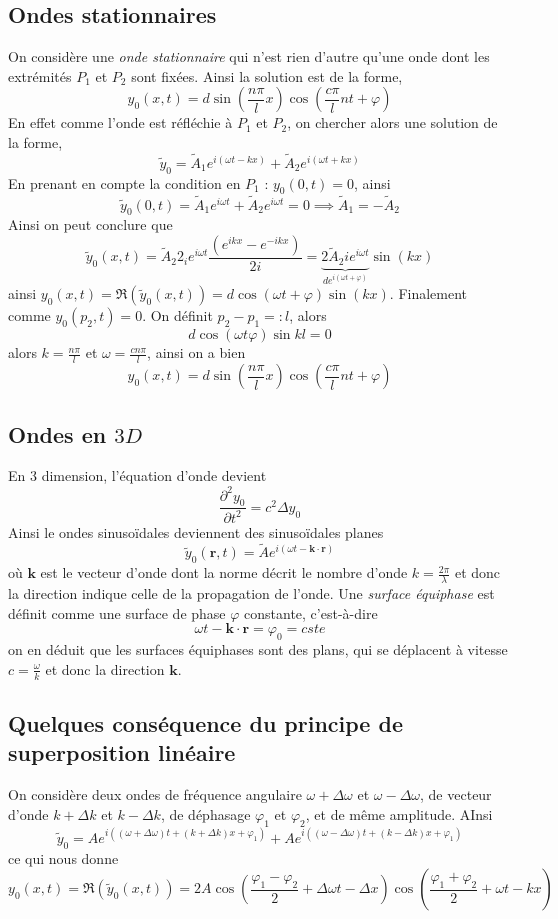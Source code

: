 \documentclass[10pt]{article}
\numberwithin{equation}{section}
\begin{document}
\subsection{Ondes stationnaires}
On considère une \emph{onde stationnaire} qui n'est rien d'autre qu'une onde dont les extrémités $P_1$ et $P_2$ sont fixées. Ainsi la solution est de la forme,
\[
\boxed{y_0(x,t) = d \sin \left(\frac{n \pi}{l} x \right) \cos\left(\frac{c \pi}{l} nt + \varphi \right)}
\]
En effet comme l'onde est réfléchie à $P_1$ et $P_2$, on chercher alors une solution de la forme,
\[
\tilde y_0 = \tilde A_1 e^{i (\omega t - kx)} +\tilde A_2 e^{i (\omega t + kx)}
\]
En prenant en compte la condition en $P_1$ : $y_0(0,t) = 0$, ainsi
\[
\tilde y_0(0,t) = \tilde A_1e^{i \omega t} + \tilde A_2 e^{i \omega t} = 0 \implies \tilde A_1 = - \tilde A_2
\]
Ainsi on peut conclure que
\[
\tilde y_0(x,t) = \tilde A_2 2_i e^{i\omega t} \frac{(e^{i k x}- e^{-i kx})}{2i} = \underbrace{2 \tilde A_2 i e^{i \omega t}}_{d e^{i(\omega t + \varphi)}} \sin(kx)
\]
ainsi $y_0(x,t) = \Re(\tilde y_0(x,t)) = d \cos(\omega t + \varphi) \sin(kx)$. Finalement comme $y_0(p_2, t) = 0$. On définit $p_2 - p_1 =: l$, alors
\[
d \cos(\omega t \varphi) \sin{kl} = 0
\]
alors $k = \frac{n \pi}{l}$ et $\omega = \frac{cn \pi}{l}$, ainsi on a bien
\[
y_0(x,t) = d \sin \left(\frac{n \pi}{l} x \right) \cos\left(\frac{c \pi}{l} nt + \varphi \right)
\]

\subsection{Ondes en $3D$}
En 3 dimension, l'équation d'onde devient
\[
\boxed{\frac{\partial^2 y_0}{\partial t^2} = c^2 \Delta y_0}
\]
Ainsi le ondes sinusoïdales deviennent des sinusoïdales planes
\[
\tilde y_0(\bm r, t) = \tilde Ae^{i (\omega t - \bm k \cdot \bm r)}
\]
où $\bm k$ est le vecteur d'onde dont la norme décrit le nombre d'onde $k = \frac{2\pi}{\lambda}$ et donc la direction indique celle de la propagation de l'onde. Une \emph{surface équiphase} est définit comme une surface de phase $\varphi$ constante, c'est-à-dire
\[
\boxed{\omega t - \bm k \cdot \bm r = \varphi_0 = cste}
\]
on en déduit que les surfaces équiphases sont des plans, qui se déplacent à vitesse $c = \frac{\omega}{k}$ et donc la direction $\bm k$.

\subsection{Quelques conséquence du principe de superposition linéaire}
On considère deux ondes de fréquence angulaire $\omega + \Delta \omega$ et $\omega - \Delta \omega$, de vecteur d'onde $k + \Delta k$ et $k - \Delta k$, de déphasage $\varphi_1$ et $\varphi_2$, et de même amplitude. AInsi
\[
\tilde y_0 = A e^{i((\omega + \Delta \omega)t + (k + \Delta k) x + \varphi_1)} + A e^{i((\omega - \Delta \omega)t + (k - \Delta k) x + \varphi_1)}
\]
ce qui nous donne
\[
\boxed{y_0(x,t) = \Re(\tilde y_0(x,t)) = 2 A \cos \left(\frac{\varphi_1 - \varphi_2}{2} + \Delta \omega t - \Delta x \right) \cos\left( \frac{\varphi_1 + \varphi_2}{2} + \omega t - k x \right)}
\]
\end{document}
